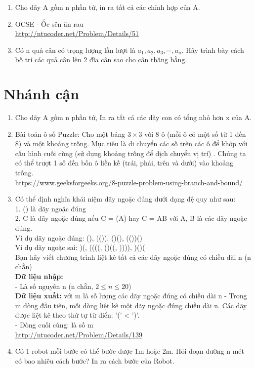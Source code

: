 \documentclass[12pt,a4paper]{article}
\begin{document}
\begin{enumerate}
	\item Cho dãy A gồm n phần tử, in ra tất cả các chỉnh hợp của A.
	\item OCSE - Ốc sên ăn rau\\
	\url{http://ntucoder.net/Problem/Details/51}
	\item Có n quả cân có trọng lượng lần lượt là $a_1, a_2, a_3,\cdots, a_n$. Hãy trình bày cách bố trí các quả cân lên 2 đĩa cân sao cho cân thăng bằng.
\end{enumerate}

\section{Nhánh cận}
\begin{enumerate}
	\item Cho dãy A gồm n phần tử, In ra tất cả các dãy con có tổng nhỏ hơn x của A.
	\item Bài toán ô số Puzzle: Cho một bảng $3 \times 3$ với 8 ô (mỗi ô có một số từ 1
đến 8) và một khoảng trống. Mục tiêu là di chuyển các số trên các ô để
khớp với cấu hình cuối cùng (sử dụng khoảng trống để dịch chuyển vị trí) .
Chúng ta có thể trượt 1 số đến bốn ô liền kề (trái, phải, trên và dưới) vào
khoảng trống.\\
\url{https://www.geeksforgeeks.org/8-puzzle-problem-using-branch-and-bound/}
	\item
	Có thể định nghĩa khái niệm dãy ngoặc đúng dưới dạng đệ quy như sau:\\
1. () là dãy ngoặc đúng\\
2. C là dãy ngoặc đúng nếu C = (A) hay C = AB với A, B là các dãy ngoặc đúng.\\
Ví dụ dãy ngoặc đúng: (), (()), ()(), (())()\\
Ví dụ dãy ngoặc sai: )(, ((((, ()((, )))), )()(\\
Bạn hãy viết chương trình liệt kê tất cả các dãy ngoặc đúng có chiều dài n (n chẵn)\\
\textbf{Dữ liệu nhập:}\\
- Là số nguyên n (n chẵn, $2 \leq n \leq 20$)\\
\textbf{Dữ liệu xuất:} với m là số lượng các dãy ngoặc đúng có chiều dài n
- Trong m dòng đầu tiên, mỗi dòng liệt kê một dãy ngoặc đúng chiều dài n. Các dãy được liệt kê theo thứ tự từ điển: '(' < ')'.\\
- Dòng cuối cùng: là số m \\
\url{http://ntucoder.net/Problem/Details/139}
	\item Có 1 robot mỗi bước có thể bước được 1m hoặc 2m. Hỏi đoạn đường n mét có bao nhiêu cách bước? In ra cách bước của Robot.
\end{enumerate}
\end{document}
